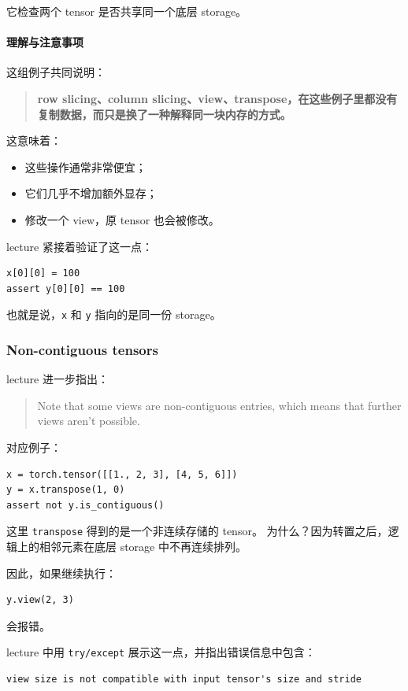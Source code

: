 \documentclass[a4paper,UTF8]{article}
\numberwithin{equation}{section}
\begin{document}
它检查两个 tensor 是否共享同一个底层 storage。

\paragraph{理解与注意事项}
这组例子共同说明：

\begin{quote}
\textbf{row slicing、column slicing、view、transpose，在这些例子里都没有复制数据，而只是换了一种解释同一块内存的方式。}
\end{quote}

这意味着：
\begin{itemize}
    \item 这些操作通常非常便宜；
    \item 它们几乎不增加额外显存；
    \item 修改一个 view，原 tensor 也会被修改。
\end{itemize}

lecture 紧接着验证了这一点：
\begin{verbatim}
x[0][0] = 100
assert y[0][0] == 100
\end{verbatim}

也就是说，\verb|x| 和 \verb|y| 指向的是同一份 storage。

\subsubsection{Non-contiguous tensors}

lecture 进一步指出：
\begin{quote}
Note that some views are non-contiguous entries, which means that further views aren't possible.
\end{quote}

对应例子：
\begin{verbatim}
x = torch.tensor([[1., 2, 3], [4, 5, 6]])
y = x.transpose(1, 0)
assert not y.is_contiguous()
\end{verbatim}

这里 \verb|transpose| 得到的是一个非连续存储的 tensor。  
为什么？因为转置之后，逻辑上的相邻元素在底层 storage 中不再连续排列。

因此，如果继续执行：
\begin{verbatim}
y.view(2, 3)
\end{verbatim}
会报错。

lecture 中用 \verb|try/except| 展示这一点，并指出错误信息中包含：
\begin{verbatim}
view size is not compatible with input tensor's size and stride
\end{verbatim}
\end{document}
